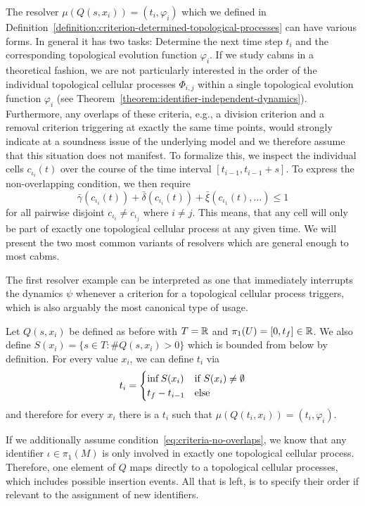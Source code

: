 The resolver $\mu(Q(s,x_i))=(t_i,\varphi_i)$ which we defined in
Definition~\ref{definition:criterion-determined-topological-processes} can have various forms.
In general it has two tasks:
Determine the next time step $t_i$ and the corresponding topological evolution function $\varphi_i$.
If we study \acp{cabm} in a theoretical fashion, we are not particularly interested in the order of
the individual topological cellular processes $\Phi_{i,j}$ within a single topological evolution
function $\varphi_i$ (see Theorem~\ref{theorem:identifier-independent-dynamics}).
Furthermore, any overlaps of these criteria, e.g., a division criterion and a removal criterion
triggering at exactly the same time points, would strongly indicate at a soundness issue of the
underlying model and we therefore assume that this situation does not manifest.
To formalize this, we inspect the individual cells $c_{\iota_i}(t)$ over the course of the time
interval $[t_{i-1},t_{i-1}+s]$.
To express the non-overlapping condition, we then require
\begin{equation}
    \bar{\gamma}(c_{\iota_i}(t))
    +\bar{\delta}(c_{\iota_i}(t))
    +\bar{\xi}(c_{\iota_1}(t),\dots)\leq 1
    \label{eq:criteria-no-overlaps}
\end{equation}
for all pairwise disjoint $c_{\iota_i}\neq c_{\iota_j}$ where $i\neq j$.
This means, that any cell will only be part of exactly one topological cellular process at any given
time.
We will present the two most common variants of resolvers which are general enough to most
\acp{cabm}.

The first resolver example can be interpreted as one that immediately interrupts the dynamics $\psi$
whenever a criterion for a topological cellular process triggers, which is also arguably the most
canonical type of usage.

\begin{example}
    Let $Q(s,x_i)$ be defined as before with $T=\mathbb{R}$ and $\pi_1(U)=[0,t_f]\in\mathbb{R}$.
    We also define $S(x_i)=\{s\in T: \# Q(s,x_i)>0\}$ which is bounded from below by definition.
    For every value $x_i$, we can define $t_i$ via
    \begin{equation}
        t_i = \begin{cases}
            \inf S(x_i) &\text{\normalfont if } S(x_i)\neq\emptyset\\
            t_f-t_{i-1} &\text{\normalfont else}
        \end{cases}
    \end{equation}
    and therefore for every $x_i$ there is a $t_i$ such that $\mu(Q(t_i,x_i))=(t_i,\varphi_i)$.

    If we additionally assume condition~\eqref{eq:criteria-no-overlaps}, we know that any identifier
    $\iota\in\pi_1(M)$ is only involved in exactly one topological cellular process.
    Therefore, one element of $Q$ maps directly to a topological cellular processes, which includes
    possible insertion events.
    All that is left, is to specify their order if relevant to the assignment of new identifiers.
    \label{example:resolver-type-1-instant}
\end{example}


